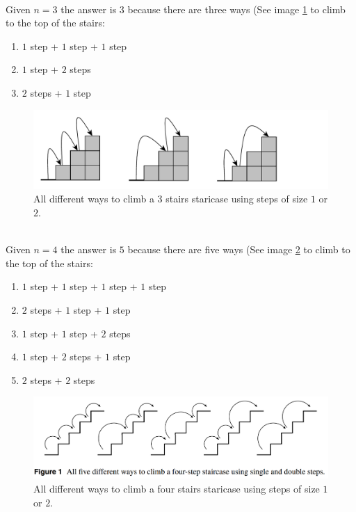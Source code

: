 \begin{example}
	\hfill \\ 
	Given $n = 3$ the answer is $3$ because there are three ways (See image \ref{fig:stair_example_3} to climb to the top of the stairs:
	\begin{enumerate}
		\item $1$ step + $1$ step + $1$ step
		\item $1$ step + $2$ steps
		\item $2$ steps + $1$ step
	\end{enumerate}

\begin{figure}
	\label{fig:stair_example_3}
	\centering
	\includegraphics[]{sources/stairs_climbing/images/stairs3}
	\caption{All different ways to climb a 3 stairs staricase using steps of size $1$ or $2$.}
\end{figure}

\end{example}

\begin{example}
	\hfill \\
	Given $n = 4$ the answer is $5$ because there are five ways (See image \ref{fig:stair_example_5} to climb to the top of the stairs:
	\begin{enumerate}
		\item $1$ step + $1$ step + $1$ step + $1$ step
		\item $2$ steps + $1$ step + $1$ step
		\item $1$ step + $1$ step + $2$ steps 
		\item $1$ step + $2$ steps + $1$ step
		\item $2$ steps +  $2$ steps
	\end{enumerate}

\begin{figure}
	\label{fig:stair_example_5}
	\centering
	\includegraphics[scale=0.5]{sources/stairs_climbing/images/5stairs}
	\caption{All different ways to climb a four stairs staricase using steps of size $1$ or $2$.}
\end{figure}

\end{example}
	

